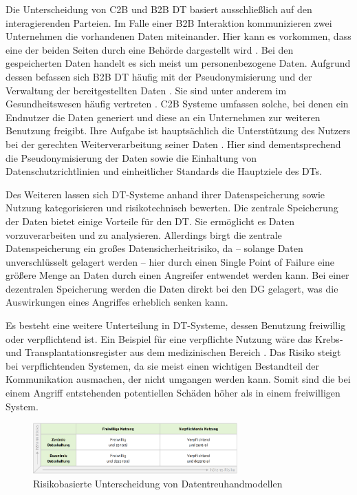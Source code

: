 \documentclass[
	fontsize=11pt,
	headings=small,
	parskip=half,           %
	bibliography=totoc,
	numbers=noenddot,       %
	open=any,               %
]{scrreprt}
\begin{document}
Die Unterscheidung von C2B und B2B DT basiert ausschließlich auf den interagierenden Parteien. Im Falle einer B2B Interaktion kommunizieren zwei Unternehmen die vorhandenen Daten miteinander. Hier kann es vorkommen, dass eine der beiden Seiten durch eine Behörde dargestellt wird \cite{dt-blankertz2020datentreuhandmodelle}. Bei den gespeicherten Daten handelt es sich meist um personenbezogene Daten. Aufgrund dessen befassen sich B2B DT häufig mit der Pseudonymisierung und der Verwaltung der bereitgestellten Daten \cite{dt-blankertz2020datentreuhandmodelle}. Sie sind unter anderem im Gesundheitswesen häufig vertreten \cite{dt-blankertz2020datentreuhandmodelle}.
C2B Systeme umfassen solche, bei denen ein Endnutzer die Daten generiert und diese an ein Unternehmen zur weiteren Benutzung freigibt. Ihre Aufgabe ist hauptsächlich die Unterstützung des Nutzers bei der gerechten Weiterverarbeitung seiner Daten \cite{dt-blankertz2020datentreuhandmodelle}. Hier sind dementsprechend die Pseudonymisierung der Daten sowie die Einhaltung von Datenschutzrichtlinien und einheitlicher Standards die Hauptziele des DTs.

Des Weiteren lassen sich DT-Systeme anhand ihrer Datenspeicherung sowie Nutzung kategorisieren und risikotechnisch bewerten. Die zentrale Speicherung der Daten bietet einige Vorteile für den DT. Sie ermöglicht es Daten vorzuverarbeiten und zu analysieren. Allerdings birgt die zentrale Datenspeicherung ein großes Datensicherheitrisiko, da -- solange Daten unverschlüsselt gelagert werden -- hier durch einen Single Point of Failure eine größere Menge an Daten durch einen Angreifer entwendet werden kann. Bei einer dezentralen Speicherung werden die Daten direkt bei den DG gelagert, was die Auswirkungen eines Angriffes erheblich senken kann. 

Es besteht eine weitere Unterteilung in DT-Systeme, dessen Benutzung freiwillig oder verpflichtend ist. Ein Beispiel für eine verpflichte Nutzung wäre das Krebs- und Transplantationsregister aus dem medizinischen Bereich \cite{dt-christmann2022krebsregister, dt-nageltransplatationsregister}. Das Risiko steigt bei verpflichtenden Systemen, da sie meist einen wichtigen Bestandteil der Kommunikation ausmachen, der nicht umgangen werden kann. Somit sind die bei einem Angriff entstehenden potentiellen Schäden höher als in einem freiwilligen System.

\begin{figure}
    \centering
    \includegraphics[width=0.7\textwidth]{DT-RisikoEinteilung.png}
    \caption{Risikobasierte Unterscheidung von Datentreuhandmodellen \cite{dt-blankertz2021neue}}
    \label{fig:dt-risikoeinteilug}
\end{figure}
\end{document}
